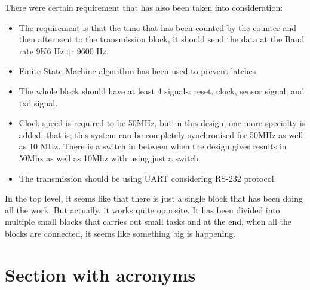 \documentclass[12pt,a4paper]{article}
\begin{document}
There were certain requirement that has also been taken into consideration:
\begin{itemize}
\item The requirement is that the time that has been counted by the counter and then after sent to the transmission block, it should send the data at the Baud rate 9K6 Hz or 9600 Hz.\

\item Finite State Machine algorithm has been used to prevent latches.

\item The whole block should have at least 4 signals: reset, clock, sensor signal, and txd signal.\

\item Clock speed is required to be 50MHz, but in this design, one more specialty is added, that is, this system can be completely synchronised for 50MHz as well as 10 MHz. There is a switch in between when the design gives results in 50Mhz as well as 10Mhz with using just a switch.\

\item The transmission should be using UART considering RS-232 protocol.\
\end{itemize}

In the top level, it seems like that there is just a single block that has been doing all the work. But actually, it works quite opposite. It has been divided into multiple small blocks that carries out small tasks and at the end, when all the blocks are connected, it seems like something big is happening. 




\newpage
\pagestyle{fancy}
\fancyfoot{}
\fancyhead{}
\setlength{\footskip=25pt}
\setlength{\headheight=0pt}

\fancyfoot{}
\newpage

\setcounter{page}{5}
\tableofcontents
\clearpage

\section*{Section with acronyms}



\printglossary[type=\acronymtype]


\listoffigures
\clearpage
\end{document}
